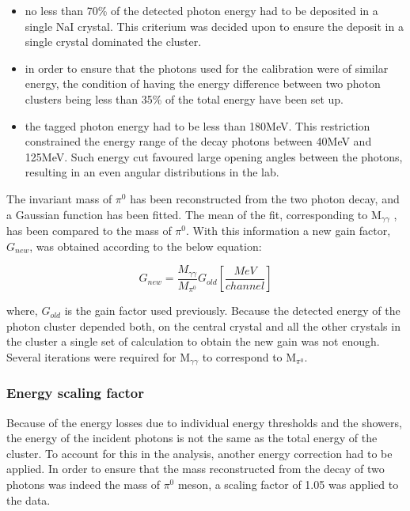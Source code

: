 \begin{itemize}
\item no less than 70\% of the detected photon energy had to be deposited in a single NaI crystal. This criterium was decided upon to ensure the deposit in a single crystal dominated the cluster.
\item in order to ensure that the photons used for the calibration were of similar energy, the condition of having the energy difference between two photon clusters being less than 35\% of the total energy have been set up.
\item the tagged photon energy had to be less than 180MeV. This restriction constrained the energy range of the decay photons between 40MeV and 125MeV. Such energy cut favoured large opening angles between the photons, resulting in an even angular distributions in the lab.
\end{itemize}

\indent The invariant mass of $\pi^{0}$ has been reconstructed from the two photon decay, and a Gaussian function has been fitted. The mean of the fit, corresponding to M$_{\gamma\gamma}$ , has been compared to the mass of $\pi^{0}$. With this information a new gain factor, $G_{new}$, was obtained according to the below equation:

\begin{equation}
G_{new}=\frac{M_{\gamma\gamma}}{M_{\pi^{0}}}G_{old} [\frac{MeV}{channel}]
\end{equation}

where, $G_{old}$ is the gain factor used previously. Because the detected energy of the photon cluster depended both, on the central crystal and all the other crystals in the cluster a single set of calculation to obtain the new gain was not enough. Several iterations were required for M$_{\gamma\gamma}$ to correspond to M$_{\pi^{0}}$.

\subsubsection{Energy scaling factor}

\indent Because of the energy losses due to individual energy thresholds and the showers, the energy of the incident photons is not the same as the total energy of the cluster. To account for this in the analysis, another energy correction had to be applied. In order to ensure that the mass reconstructed from the decay of two photons was indeed the mass of $\pi^{0}$ meson, a scaling factor of 1.05 was applied to the data.

